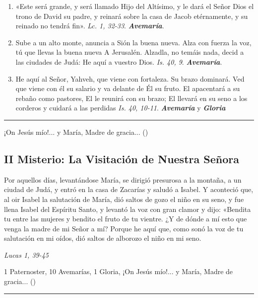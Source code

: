 \documentclass[./rosary.tex]{subfiles}
\begin{document}
\begin{enumerate}
      \item «Este será grande, y será llamado Hijo del Altísimo, y le dará el Señor Dios el trono de David su padre,
            y reinará sobre la casa de Jacob etérnamente, y su reinado no tendrá fin».  \emph{Lc. 1, 32-33}. \textbf{\emph{Avemaría}}.

      \item Sube a un alto monte, anuncia a Sión la buena nueva. Alza con fuerza la voz, tú que llevas la buena nueva A Jerusalén. Alzadla, no temáis nada, decid a las ciudades de Judá:
            He aquí a vuestro Dios. \emph{Is. 40, 9}. \textbf{\emph{Avemaría}}.

      \item He aquí al Señor, Yahveh, que viene con fortaleza. Su brazo dominará. Ved que viene con él su salario y va delante de Él su fruto. El apacentará a su rebaño como pastores,
            El le reunirá con su brazo; El llevará en su seno a los corderos y cuidará a las perdidas \emph{Is. 40, 10-11}.
            \textbf{\emph{Avemaría}} y \textbf{\emph{Gloria}}
\end{enumerate}

\rule{\textwidth}{0.5pt}
¡On Jesús mío!... y María, Madre de gracia... ()

\subsection*{II Misterio: La Visitación de Nuestra Señora}

Por aquellos días, levantándose María, se dirigió presurosa a la montaña, a un ciudad de Judá, y entró en la casa de Zacarías y saludó a Isabel.
Y aconteció que, al oir Isabel la salutación de María, dió saltos de gozo el niño en su seno, y fue llena Isabel del Espíritu Santo,
y levantó la voz con gran clamor y dijo: «Bendita tu entre las mujeres y bendito el fruto de tu vientre. ¿Y de dónde a mí esto que venga la madre de mi Señor a mí?
Porque he aquí que, como sonó la voz de tu salutación en mi oídos, dió saltos de alborozo el niño en mi seno.

\begin{flushright}
      \emph{Lucas 1, 39-45}
\end{flushright}

1 Paternoster, 10 Avemarías, 1 Gloria, ¡On Jesús mío!... y María, Madre de gracia... ()

\rule{\textwidth}{0.5pt}
\end{document}
